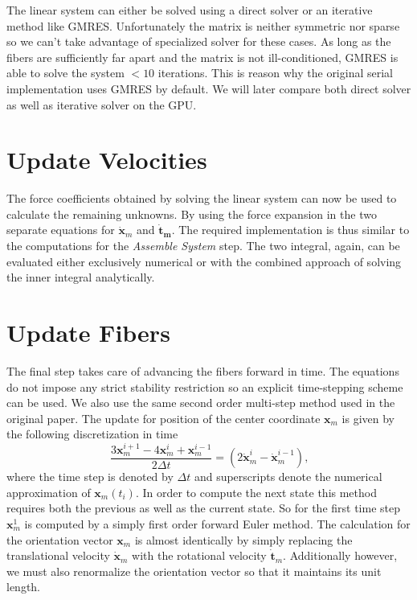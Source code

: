 \documentclass[a4paper,11pt]{kth-mag}
\begin{document}
The linear system can either be solved using a direct solver or an iterative method like GMRES. Unfortunately the matrix is neither symmetric nor sparse so we can't take advantage of specialized solver for these cases. As long as the fibers are sufficiently far apart and the matrix is not ill-conditioned, GMRES is able to solve the system $<10$ iterations. This is reason why the original serial implementation uses GMRES by default. We will later compare both direct solver as well as iterative solver on the GPU.

\section{Update Velocities}

The force coefficients obtained by solving the linear system can now be used to calculate the remaining unknowns. By using the force expansion in the two separate equations for $\mathbf{\dot{x}}_m$ and $\mathbf{\dot{t}_m}$. The required implementation is thus similar to the computations for the \emph{Assemble System} step. The two integral, again, can be evaluated either exclusively numerical or with the combined approach of solving the inner integral analytically.

\section{Update Fibers}
\label{sec:serial_update_fibers}

The final step takes care of advancing the fibers forward in time. The equations do not impose any strict stability restriction so an explicit time-stepping scheme can be used. We also use the same second order multi-step method used in the original paper. The update for position of the center coordinate $\mathbf{x}_m$ is given by the following discretization in time
\begin{equation}
  \label{eq:time_discretization}
  \frac{3\mathbf{x}_m^{i+1} - 4\mathbf{x}_m^{i} + \mathbf{x}_m^{i-1}}{2 \Delta t} = (2\mathbf{\dot{x}}_m^{i} - \mathbf{\dot{x}}_m^{i-1}) \text{,}
\end{equation}
where the time step is denoted by $\Delta t$ and superscripts denote the numerical approximation of $\mathbf{x}_m(t_i)$. In order to compute the next state this method requires both the previous as well as the current state. So for the first time step $\mathbf{x}_{m}^{1}$ is computed by a simply first order forward Euler method. The calculation for the orientation vector $\mathbf{x}_m$ is almost identically by simply replacing the translational velocity $\mathbf{\dot{x}}_m$ with the rotational velocity $\mathbf{\dot{t}}_m$. Additionally however, we must also renormalize the orientation vector so that it maintains its unit length.
\end{document}
